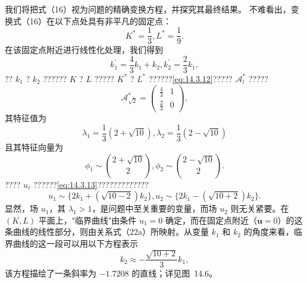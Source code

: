 我们将把式（16）视为问题的精确变换方程，并探究其最终结果。
不难看出，变换式（16）在以下点处具有非平凡的固定点：
\begin{equation}\tag{14.4.18}\label{eq:14.4.18}
K ^{*} = \frac { 1 } { 3 } ,  L ^{*} = \frac { 1 } { 9 } .
\end{equation}
在该固定点附近进行线性化处理，我们得到
\begin{equation}\tag{14.4.19}\label{eq:14.4.19}
k _ { 1 } ^{\prime} = \frac { 4 } { 3 } k _ { 1 } + k _ { 2 } ,  k _ { 2 } ^{\prime} = \frac { 2 } { 3 } k _ { 1 } ,
\end{equation}
?? \(k_{1}\) ? \(k_{2}\) ?????? \(K\) ? \(L\) ????? \(K^{*}\) ? \(L^{*}\) ??????\autoref{eq:14.3.12}????? \(\mathcal{A}_{l}^{*}\) ?????
\begin{equation}\tag{14.4.20}\label{eq:14.4.20}
\mathcal { A } _ { \sqrt { 2 } } ^{*} = \left( \begin{array}{ll} { \frac { 4 } { 3 } } & { 1 } \\{ \frac { 2 } { 3 } } & { 0 } \end{array} \right) ,
\end{equation}
其特征值为
\begin{equation}\tag{14.4.21}\label{eq:14.4.21}
\lambda _ { 1 } = \frac { 1 } { 3 } ( 2 + \sqrt { 10 } ) ,  \lambda _ { 2 } = \frac { 1 } { 3 } ( 2 - \sqrt { 10 } )
\end{equation}
且其特征向量为
\begin{equation}\tag{14.4.22}\label{eq:14.4.22}
\phi _ { 1 } \sim \binom { 2 + \sqrt { 10 } } { 2 } ,  \phi _ { 2 } \sim \binom { 2 - \sqrt { 10 } } { 2 } .
\end{equation}
???? \(u_{i}\) ??????\autoref{eq:14.3.13}?????????????
\begin{equation}\tag{14.4.23}\label{eq:14.4.23}
u _ { 1 } \sim \{ 2 k _ { 1 } + ( \sqrt { 10 - 2 } ) k _ { 2 } \} ,  u _ { 2 } \sim \{ 2 k _ { 1 } - ( \sqrt { 10 + 2 } ) k _ { 2 } \} .
\end{equation}
显然，场 \(u_{1}\)，其 \(\lambda_{1} > 1\)，是问题中至关重要的变量，而场 \(u_{2}\) 则无关紧要。在 \((K,L)\) 平面上，"临界曲线"由条件 \(u_{1} = 0\) 确定，而在固定点附近（\(\boldsymbol{u} = 0\)）的这条曲线的线性部分，则由关系式（22a）所映射。从变量 \(k_{1}\) 和 \(k_{2}\) 的角度来看，临界曲线的这一段可以用以下方程表示
\begin{equation}\tag{14.4.24}\label{eq:14.4.24}
k _ { 2 } \approx - \frac { \sqrt { 10 + 2 } } { 3 } k _ { 1 } ,
\end{equation}
该方程描绘了一条斜率为 \(-1.7208\) 的直线；详见图~14.6。
